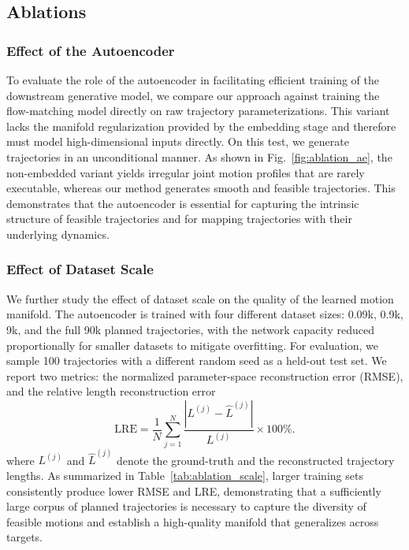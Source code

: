 \documentclass[letterpaper, 10 pt, conference]{ieeeconf}  %
\begin{document}
\subsection{Ablations}
\subsubsection{Effect of the Autoencoder}
To evaluate the role of the autoencoder in facilitating efficient training of the downstream generative model, we compare our approach against training the flow-matching model directly on raw trajectory parameterizations.
This variant lacks the manifold regularization provided by the embedding stage and therefore must model high-dimensional inputs directly.
On this test, we generate trajectories in an unconditional manner.
As shown in Fig.~\ref{fig:ablation_ae}, the non-embedded variant yields irregular joint motion profiles that are rarely executable, whereas our method generates smooth and feasible trajectories.
This demonstrates that the autoencoder is essential for capturing the intrinsic structure of feasible trajectories
and for mapping trajectories with their underlying dynamics.

\subsubsection{Effect of Dataset Scale}
We further study the effect of dataset scale on the quality of the learned motion manifold.
The autoencoder is trained with four different dataset sizes: 0.09k, 0.9k, 9k, and the full 90k planned trajectories,
with the network capacity reduced proportionally for smaller datasets to mitigate overfitting.
For evaluation, we sample 100 trajectories with a different random seed as a held-out test set.
We report two metrics: the normalized parameter-space reconstruction error (RMSE), and the relative length reconstruction error
\begin{equation}
    \mathrm{LRE} = \frac{1}{N}\sum_{j=1}^{N} \frac{|L^{(j)} - \hat L^{(j)}|}{L^{(j)}} \times 100\% .
    \label{eq:lre}
\end{equation}
where $L^{(j)}$ and $\hat L^{(j)}$ denote the ground-truth and the reconstructed trajectory lengths.
As summarized in Table~\ref{tab:ablation_scale}, larger training sets consistently produce lower RMSE and LRE, demonstrating that a sufficiently large corpus of planned trajectories is necessary to capture the diversity of feasible motions and establish a high-quality manifold that generalizes across targets.
\end{document}
